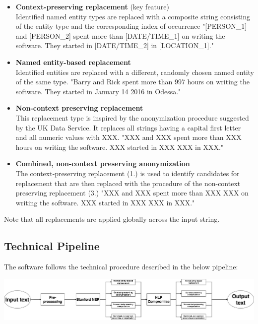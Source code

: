 \documentclass{article}
\begin{document}
\begin{itemize} \itemsep -2pt
\item \textbf{Context-preserving replacement} (key feature) \\
Identified named entity types are replaced with a composite string consisting of the entity type and the corresponding index of occurrence
"[PERSON\_1] and [PERSON\_2] spent more than [DATE/TIME\_1] on writing the software. They started in [DATE/TIME\_2] in [LOCATION\_1]."
\item \textbf{Named entity-based replacement} \\
Identified entities are replaced with a different, randomly chosen named entity of the same type.
"Barry and Rick spent more than 997 hours on writing the software. They started in January 14 2016 in Odessa."
\item \textbf{Non-context preserving replacement} \\
This replacement type is inspired by the anonymization procedure suggested by the UK Data Service. It replaces all strings having a capital first letter and all numeric values with XXX.
"XXX and XXX spent more than XXX hours on writing the software. XXX started in XXX XXX in XXX."
\item \textbf{Combined, non-context preserving anonymization} \\
The context-preserving replacement (1.) is used to identify candidates for replacement that are then replaced with the procedure of the non-context preserving replacement (3.)
"XXX and XXX spent more than XXX XXX on writing the software. XXX started in XXX XXX in XXX."
\end{itemize}
Note that all replacements are applied globally across the input string.

\subsection*{Technical Pipeline}
The software follows the technical procedure described in the below pipeline:
\begin{center}
\includegraphics[scale=0.26]{technical_pipeline.jpg}
\end{center}
\end{document}
